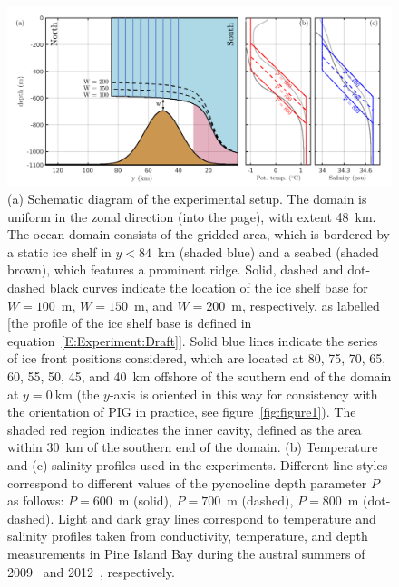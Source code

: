 \documentclass[draft]{agujournal2019}
\begin{document}
\begin{figure}
    \centering
    \includegraphics[width = \textwidth]{plots/figure2.pdf}
    \caption{(a) Schematic diagram of the experimental setup. The domain is uniform in the zonal direction (into the page), with extent 48~km. The ocean domain consists of the gridded area, which is bordered by a static ice shelf in $y < 84$~km (shaded blue) and a seabed (shaded brown), which features a prominent ridge. Solid, dashed and dot-dashed black curves indicate the location of the ice shelf base for $W=100$~m, $W=150$~m, and $W=200$~m, respectively, as labelled [the profile of the ice shelf base is defined in equation~\eqref{E:Experiment:Draft}]. Solid blue lines indicate the series of ice front positions considered, which are located at 80, 75, 70, 65, 60, 55, 50, 45, and 40~km offshore of the southern end of the domain at $y = 0~\text{km}$ (the $y$-axis is oriented in this way for consistency with the orientation of PIG in practice, see figure~\ref{fig:figure1}). The shaded red region indicates the inner cavity, defined as the area within 30~km of the southern end of the domain. (b) Temperature and (c) salinity profiles used in the experiments. Different line styles correspond to different values of the pycnocline depth parameter $P$ as follows: $P=600$~m (solid), $P=700$~m (dashed), $P=800$~m (dot-dashed). Light and dark gray lines correspond to temperature and salinity profiles taken from conductivity, temperature, and depth measurements in Pine Island Bay during the austral summers of 2009~\cite{Jacobs2011NatureGeosci} and 2012~\cite{Dutrieux2014Science}, respectively.}
    \label{fig:figure2}
\end{figure}
\end{document}
